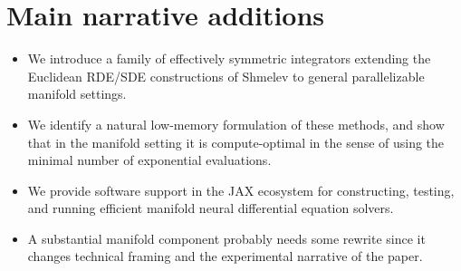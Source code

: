 \documentclass{article}
\begin{document}
\section{Main narrative additions}
\begin{itemize}
    \item We introduce a family of effectively symmetric integrators extending the Euclidean RDE/SDE constructions of Shmelev to general parallelizable manifold settings.
    
    \item We identify a natural low-memory formulation of these methods, and show that in the manifold setting it is compute-optimal in the sense of using the minimal number of exponential evaluations.
    
    \item We provide software support in the JAX ecosystem for constructing, testing, and running efficient manifold neural differential equation solvers.
    
    \item A substantial manifold component probably needs some rewrite since it changes technical framing and the experimental narrative of the paper.
\end{itemize}
\end{document}
